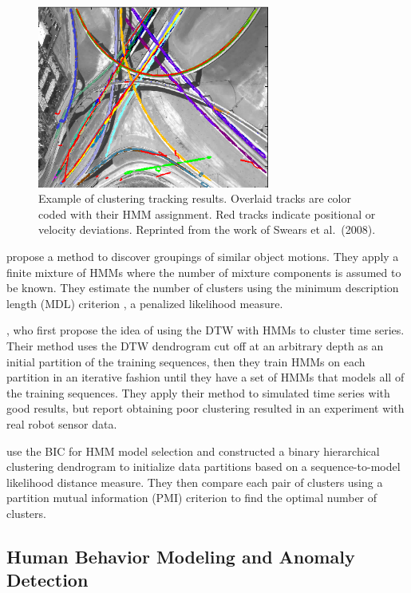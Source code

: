 \begin{figure}[t]
  \centering
  \includegraphics[width=3in]{figures/swears-clustering-result.png}
  \caption[Example of clustering tracking results]{Example of
    clustering tracking results. Overlaid tracks are color coded with
    their HMM assignment. Red tracks indicate positional or velocity
    deviations. Reprinted from the work of Swears et al.\ (2008).}
  \label{fig:swears-clustering-result}
\end{figure}

 propose a method to discover groupings
of similar object motions. They apply a finite mixture of HMMs where
the number of mixture components is assumed to be known. They estimate
the number of clusters using the minimum description length (MDL)
criterion , a penalized likelihood measure.

, who first propose the idea of using
the DTW with HMMs to cluster time series. Their method uses the DTW
dendrogram cut off at an arbitrary depth as an initial partition of
the training sequences, then they train HMMs on each partition in an
iterative fashion until they have a set of HMMs that models all of the
training sequences. They apply their method to simulated time series
with good results, but report obtaining poor clustering resulted in an
experiment with real robot sensor data.

 use the BIC for HMM model selection and
constructed a binary hierarchical clustering dendrogram to initialize
data partitions based on a sequence-to-model likelihood distance
measure. They then compare each pair of clusters using a partition
mutual information (PMI) criterion  to find
the optimal number of clusters.

\subsection{Human Behavior Modeling and Anomaly Detection}

